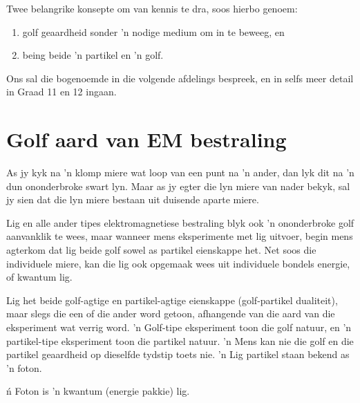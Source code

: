 Twee belangrike konsepte om van kennis te dra, soos hierbo genoem:
\begin{enumerate}[noitemsep, label=\textbf{\arabic*}. ]
 \item golf geaardheid sonder 'n nodige medium om in te beweeg, en 
 \item being beide 'n partikel en 'n golf. 
\end{enumerate}
Ons sal die bogenoemde in die volgende afdelings bespreek, en in selfs meer detail in Graad 11 en 12 ingaan. 

    \label{m38777*cid3}
            \section{Golf aard van EM bestraling}
            \nopagebreak
      \label{m38777*id186686}As jy kyk na 'n klomp miere wat loop van een punt na 'n ander, dan lyk dit na 'n dun ononderbroke swart lyn. Maar as jy egter die lyn miere van nader bekyk, sal jy sien dat die lyn miere bestaan uit duisende aparte miere.\par 
      \label{m38777*id187029}Lig en alle ander tipes elektromagnetiese bestraling blyk ook 'n ononderbroke golf aanvanklik te wees, maar wanneer mens eksperimente met lig uitvoer, begin mens agterkom dat lig beide golf sowel as partikel eienskappe het. Net soos die individuele miere, kan die lig ook opgemaak wees uit individuele bondels energie, of kwantum lig.\par 
      \label{m38777*id187035}Lig het beide golf-agtige en partikel-agtige eienskappe (golf-partikel dualiteit), maar slegs die een of die ander word getoon, afhangende van die aard van die eksperiment wat verrig word. 'n Golf-tipe eksperiment toon die golf natuur, en 'n partikel-tipe eksperiment toon die partikel natuur. 'n Mens kan nie die golf en die partikel geaardheid op dieselfde tydstip toets nie. 'n Lig partikel staan bekend as 'n foton.\par 




\label{m38777*fhsst!!!underscore!!!id75} { \label{m38777*meaningfhsst!!!underscore!!!id75}
      \label{m38777*id187051}\'n Foton is 'n kwantum (energie pakkie) lig.\par 
       } 


